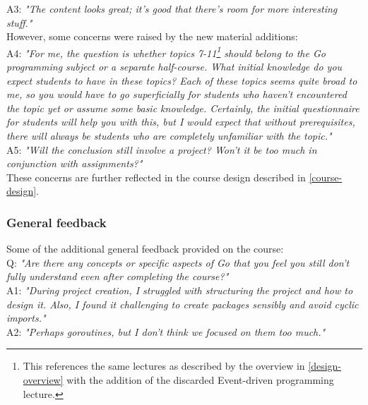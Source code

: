 \documentclass[
  digital,
  color,
  oneside,
  nosansbold,
  nocolorbold,
  lof,
  lot,
]{fithesis4}
\begin{document}
\noindent
A3: \textit{"The content looks great; it's good that there's room for more interesting stuff."} \\

\noindent
However, some concerns were raised by the new material additions: \\

\noindent
A4: \textit{"For me, the question is whether topics 7-11\footnote{This references the same lectures as described by the overview in \cref{design-overview} with the addition of the discarded Event-driven programming lecture.} should belong to the Go programming subject or a separate half-course. What initial knowledge do you expect students to have in these topics? Each of these topics seems quite broad to me, so you would have to go superficially for students who haven't encountered the topic yet or assume some basic knowledge. Certainly, the initial questionnaire for students will help you with this, but I would expect that without prerequisites, there will always be students who are completely unfamiliar with the topic."} \\

\noindent
A5: \textit{"Will the conclusion still involve a project? Won't it be too much in conjunction with assignments?"} \\

\noindent
These concerns are further reflected in the course design described in \cref{course-design}. \\

\subsubsection{General feedback}

\noindent
Some of the additional general feedback provided on the course: \\

\noindent
Q: \textit{"Are there any concepts or specific aspects of Go that you feel you still don't fully understand even after completing the course?"} \\

\noindent
A1: \textit{"During project creation, I struggled with structuring the project and how to design it. Also, I found it challenging to create packages sensibly and avoid cyclic imports."} \\

\noindent
A2: \textit{"Perhaps goroutines, but I don't think we focused on them too much."} \\
\end{document}
